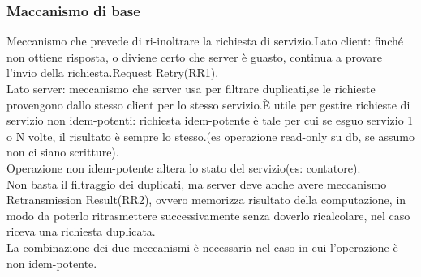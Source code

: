 \documentclass{article}
\begin{document}
\subsubsection{Maccanismo di base}
Meccanismo che prevede di ri-inoltrare la richiesta di servizio.Lato client: finché non ottiene risposta, o diviene certo che server è guasto, continua a provare l'invio della richiesta.Request Retry(RR1).\\Lato server: meccanismo che server usa per filtrare duplicati,se le richieste provengono dallo stesso client per lo stesso servizio.È utile per gestire richieste di servizio non idem-potenti: richiesta idem-potente è tale per cui se esguo servizio 1 o N volte, il risultato è sempre lo stesso.(es operazione read-only su db, se assumo non ci siano scritture).\\Operazione non idem-potente altera lo stato del servizio(es: contatore).\\Non basta il filtraggio dei duplicati, ma server deve anche avere meccanismo Retransmission Result(RR2), ovvero memorizza risultato della computazione, in modo da poterlo ritrasmettere successivamente senza doverlo ricalcolare, nel caso riceva una richiesta duplicata.\\La combinazione dei due meccanismi è necessaria nel caso in cui l'operazione è non idem-potente.\\
\end{document}
